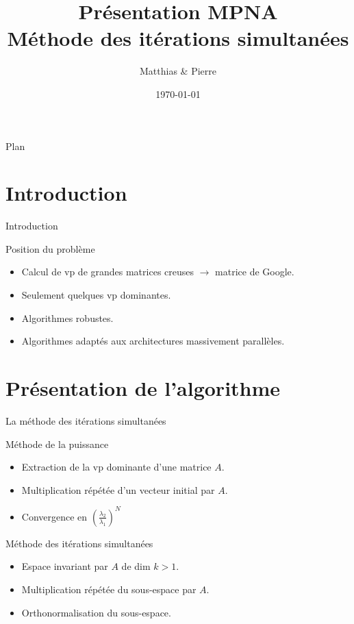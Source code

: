 \documentclass[9.5pt]{beamer}
\title[MPNA : MIS]{Présentation MPNA \\Méthode des itérations simultanées}
\author[\bsc{Beaupère} \& \bsc{Granger}]{Matthias \bsc{Beaupère} \& Pierre \bsc{Granger}}
\institute{M2 CHPS}
\date{\today}
\begin{document}

\begin{frame}
  \titlepage
\end{frame}

\begin{frame}{Plan}
	\tableofcontents[hideallsubsections]
\end{frame}

\section{Introduction}
	\begin{frame}{Introduction}
		\begin{block}{Position du problème}
			\begin{itemize}
				\item Calcul de vp de grandes matrices creuses $\rightarrow$ matrice de Google.
				\item Seulement quelques vp dominantes.
				\item Algorithmes robustes.
				\item Algorithmes adaptés aux architectures massivement parallèles.
			\end{itemize}
		\end{block}
	\end{frame}

\section{Présentation de l'algorithme}
	\begin{frame}{La méthode des itérations simultanées}
		\begin{block}{Méthode de la puissance}
			\begin{itemize}
				\item Extraction de la vp dominante d'une matrice $A$.
				\item Multiplication répétée d'un vecteur initial par $A$.
				\item Convergence en $\left(\frac{\lambda_2}{\lambda_1}\right)^N$
			\end{itemize}
		\end{block}

		\begin{block}{Méthode des itérations simultanées}
			\begin{itemize}
				\item Espace invariant par $A$ de dim $k > 1$.
				\item Multiplication répétée du sous-espace par $A$.
				\item Orthonormalisation du sous-espace.
			\end{itemize}
		\end{block}
	\end{frame}
\end{document}
